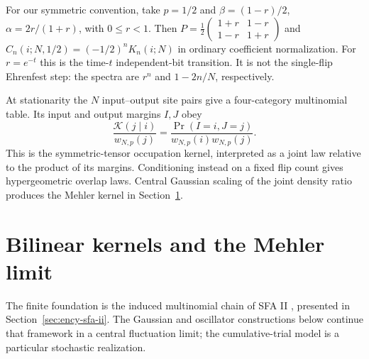 \documentclass[11pt,reqno]{amsart}
\begin{document}
For our symmetric convention, take $p=1/2$ and
$\beta=(1-r)/2$, $\alpha=2r/(1+r)$, with $0\le r<1$.
Then $P=\frac12\left(\begin{smallmatrix}1+r&1-r\\1-r&1+r\end{smallmatrix}\right)$
and $C_n(i;N,1/2)=(-1/2)^nK_n(i;N)$ in ordinary coefficient
normalization. For $r=e^{-t}$ this is the time-$t$ independent-bit
transition. It is not the single-flip Ehrenfest step: the spectra are
$r^n$ and $1-2n/N$, respectively.

At stationarity the $N$ input--output site pairs give a four-category
multinomial table. Its input and output margins $I,J$ obey
\[
\frac{\mathcal K(j\mid i)}{w_{N,p}(j)}
=\frac{\Pr(I=i,J=j)}{w_{N,p}(i)w_{N,p}(j)}.
\]
This is the symmetric-tensor occupation kernel, interpreted as a joint
law relative to the product of its margins. Conditioning instead on a
fixed flip count gives hypergeometric overlap laws. Central Gaussian
scaling of the joint density ratio produces the Mehler kernel in
Section~\ref{sec:11-3}.

\section{Bilinear kernels and the Mehler limit}
\label{sec:11-3}
The finite foundation is the induced multinomial chain of SFA II
\cite{FeinsilverSFAII2023}, presented in
Section~\ref{sec:ency-sfa-ii}. The Gaussian and oscillator constructions
below continue that framework in a central fluctuation limit; the
cumulative-trial model is a particular stochastic realization.
\end{document}
